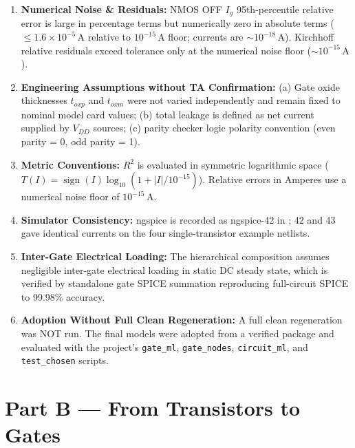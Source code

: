 \documentclass[11pt,a4paper]{article}
\numberwithin{table}{section}
\numberwithin{figure}{section}
\begin{document}
\begin{enumerate}[itemsep=0.2em,leftmargin=1.5em]
    \item \textbf{Numerical Noise \& Residuals:} NMOS OFF $I_g$ 95th-percentile relative error is large in percentage terms but numerically zero in absolute terms ($\le 1.6 \times 10^{-5}\,\mathrm{A}$ relative to $10^{-15}\,\mathrm{A}$ floor; currents are $\sim 10^{-18}\,\mathrm{A}$). Kirchhoff relative residuals exceed tolerance only at the numerical noise floor ($\sim 10^{-15}\,\mathrm{A}$).
    \item \textbf{Engineering Assumptions without TA Confirmation:} (a) Gate oxide thicknesses $t_{oxp}$ and $t_{oxm}$ were not varied independently and remain fixed to nominal model card values; (b) total leakage is defined as net current supplied by $V_{DD}$ sources; (c) parity checker logic polarity convention (even parity = 0, odd parity = 1).
    \item \textbf{Metric Conventions:} $R^2$ is evaluated in symmetric logarithmic space ($T(I) = \operatorname{sign}(I)\log_{10}(1 + |I|/10^{-15})$). Relative errors in Amperes use a numerical noise floor of $10^{-15}\,\mathrm{A}$.
    \item \textbf{Simulator Consistency:} ngspice is recorded as ngspice-42 in ; 42 and 43 gave identical currents on the four single-transistor example netlists.
    \item \textbf{Inter-Gate Electrical Loading:} The hierarchical composition assumes negligible inter-gate electrical loading in static DC steady state, which is verified by standalone gate SPICE summation reproducing full-circuit SPICE to 99.98\% accuracy.
    \item \textbf{Adoption Without Full Clean Regeneration:} A full clean regeneration was NOT run. The final models were adopted from a verified package and evaluated with the project's \texttt{gate\_ml}, \texttt{gate\_nodes}, \texttt{circuit\_ml}, and \texttt{test\_chosen} scripts.
\end{enumerate}

\section{Part B — From Transistors to Gates}
\end{document}
